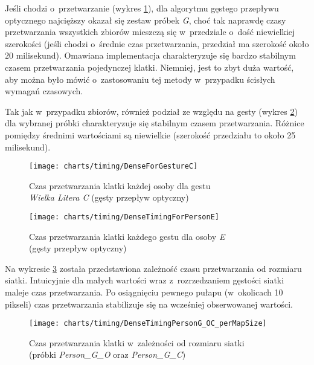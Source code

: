     Jeśli chodzi o~przetwarzanie (wykres \ref{fig:DenseForGestureC}), dla algorytmu gęstego przepływu optycznego najcięższy okazał się zestaw próbek \textit{G}, choć tak naprawdę czasy przetwarzania wszystkich zbiorów mieszczą się w~przedziale o~dość niewielkiej szerokości (jeśli chodzi o~średnie czas przetwarzania, przedział ma szerokość około $20$ milisekund). Omawiana implementacja charakteryzuje się bardzo stabilnym czasem przetwarzania pojedynczej klatki. Niemniej, jest to zbyt duża wartość, aby można było mówić o~zastosowaniu tej metody w~przypadku ścisłych wymagań czasowych.

    Tak jak w~przypadku zbiorów, również podział ze względu na gesty (wykres \ref{fig:DenseTimingForPersonE}) dla wybranej próbki charakteryzuje się stabilnym czasem przetwarzania. Różnice pomiędzy średnimi wartościami są niewielkie (szerokość przedziału to około 25 milisekund).

      \begin{figure}[!ht]
        \centering
        \texttt{[image: charts/timing/DenseForGestureC]}
        \caption[Czas przetwarzania klatki każdej osoby dla gestu C (gęsty przepływ optyczny)]
                {Czas przetwarzania klatki każdej osoby dla gestu \\\textit{Wielka Litera C} (gęsty przepływ optyczny)}
        \label{fig:DenseForGestureC}
      \end{figure}

      \begin{figure}[!ht]
        \centering
        \texttt{[image: charts/timing/DenseTimingForPersonE]}
        \caption[Czas przetwarzania klatki każdego gestu dla osoby E (gęsty przepływ optyczny)]
                {Czas przetwarzania klatki każdego gestu dla osoby \textit{E}\\(gęsty przepływ optyczny)}
        \label{fig:DenseTimingForPersonE}
      \end{figure}

    \newpage
    Na wykresie \ref{fig:DenseTimingPerMapSize} została przedstawiona zależność czasu przetwarzania od rozmiaru siatki. Intuicyjnie dla małych wartości wraz z~rozrzedzaniem gęstości siatki maleje czas przetwarzania. Po osiągnięciu pewnego pułapu (w~okolicach 10 pikseli) czas przetwarzania stabilizuje się na wcześniej obserwowanej wartości.

      \begin{figure}[!ht]
        \centering
        \texttt{[image: charts/timing/DenseTimingPersonG\_OC\_perMapSize]}
        \caption[Czas przetwarzania klatki w~zależności od rozmiaru siatki]
                {Czas przetwarzania klatki w~zależności od rozmiaru siatki\\(próbki \textit{Person\_G\_O} oraz \textit{Person\_G\_C})}
        \label{fig:DenseTimingPerMapSize}
      \end{figure}

